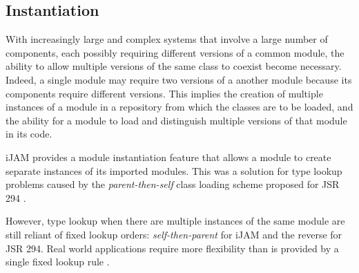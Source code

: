 \subsection{Instantiation}
With increasingly large and complex systems that involve a large number of components,
each possibly requiring different versions of a common module,
the ability to allow multiple versions of the same class to coexist become necessary.
Indeed, a single module may require two versions of a another module because its
components require different versions. This implies the creation of multiple instances 
of a module in a repository from which the classes are to be loaded, and the ability
for a module to load and distinguish multiple versions of that module in its code.

iJAM \cite{iJAM} provides a module instantiation feature that allows a module to create
separate instances of its imported modules. This was a solution for type lookup
problems caused by the {\it parent-then-self} class loading scheme proposed for
JSR 294 \cite{JSR294}.

However, type lookup when there are multiple instances of the same module are still
reliant of fixed lookup orders: {\it self-then-parent} for iJAM and the reverse for JSR 294.
Real world applications require more flexibility than is provided by a single fixed
lookup rule \cite{iJAMComments}.